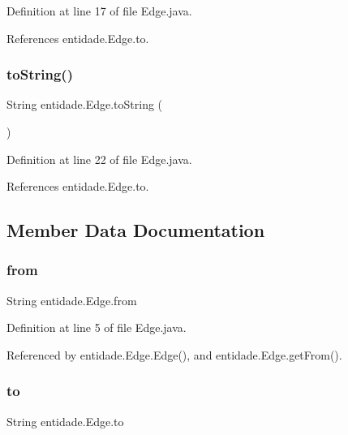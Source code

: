Definition at line 17 of file Edge.\+java.



References entidade.\+Edge.\+to.

\hypertarget{classentidade_1_1Edge_a584386c6625287aa683413263db3de3a}{}\label{classentidade_1_1Edge_a584386c6625287aa683413263db3de3a} 
\subsubsection{\texorpdfstring{to\+String()}{toString()}}
{\footnotesize\ttfamily String entidade.\+Edge.\+to\+String (\begin{DoxyParamCaption}{ }\end{DoxyParamCaption})}



Definition at line 22 of file Edge.\+java.



References entidade.\+Edge.\+to.



\subsection{Member Data Documentation}
\hypertarget{classentidade_1_1Edge_a07aaa9aa9967df0794ebc3f18e3e97d9}{}\label{classentidade_1_1Edge_a07aaa9aa9967df0794ebc3f18e3e97d9} 
\subsubsection{\texorpdfstring{from}{from}}
{\footnotesize\ttfamily String entidade.\+Edge.\+from\hspace{0.3cm}{\ttfamily [private]}}



Definition at line 5 of file Edge.\+java.



Referenced by entidade.\+Edge.\+Edge(), and entidade.\+Edge.\+get\+From().

\hypertarget{classentidade_1_1Edge_a642c55ff920cf29678aa54b15ee52f9f}{}\label{classentidade_1_1Edge_a642c55ff920cf29678aa54b15ee52f9f} 
\subsubsection{\texorpdfstring{to}{to}}
{\footnotesize\ttfamily String entidade.\+Edge.\+to\hspace{0.3cm}{\ttfamily [private]}}



